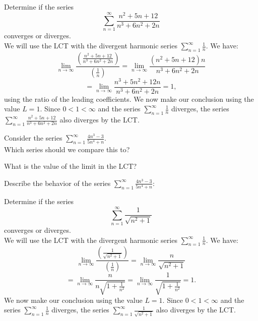 \documentclass{ximera}
\begin{document}
\begin{example}
Determine if the series 
\[
\sum_{n=1}^\infty \frac{n^2 + 5n + 12}{n^3 + 6n^2 + 2n}
\]
converges or diverges.\\
We will use the LCT with the divergent harmonic series $\displaystyle{\sum_{n=1}^\infty \frac{1}{n}}$. We have:
\[
\lim_{n \to \infty} \frac{\left(\frac{n^2 + 5n + 12}{n^3 + 6n^2 + 2n}\right)}{\left(\frac{1}{n}\right)} = \lim_{n \to \infty} \frac{(n^2 + 5n + 12)n}{n^3 + 6n^2 + 2n}
\]
\[
= \lim_{n \to \infty} \frac{n^3 + 5n^2 + 12n}{n^3 + 6n^2 + 2n} = 1,
\]
using the ratio of the leading coefficients. We now make our conclusion using the value $L = 1$. Since $0 < 1 < \infty$ and the series $\displaystyle{\sum_{n=1}^\infty \frac{1}{n}}$
diverges, the series $\displaystyle{\sum_{n=1}^\infty \frac{n^2 + 5n + 12}{n^3 + 6n^2 + 2n}}$ also diverges by the LCT.
\end{example}




\begin{problem}
Consider the series $\displaystyle{\sum_{n=1}^\infty \frac{4n^3 -3}{5n^4 + n}}$.\\
Which series should we compare this to?

\begin{multipleChoice}
\end{multipleChoice}

What is the value of the limit in the LCT?
\begin{multipleChoice}
\end{multipleChoice}

Describe the behavior of the series $\displaystyle{\sum_{n=1}^\infty \frac{4n^3 -3}{5n^4 +n}:}$
\begin{multipleChoice}
\end{multipleChoice}

\end{problem}





\begin{example}
Determine if the series 
\[
\sum_{n=1}^\infty \frac{1}{\sqrt{n^2 + 1}}
\]
converges or diverges.\\
We will use the LCT with the divergent harmonic series $\displaystyle{\sum_{n=1}^\infty \frac{1}{n}}$. We have:
\[
\lim_{n \to \infty} \frac{\left(\frac{1}{\sqrt{n^2 + 1}}\right)}{\left(\frac{1}{n}\right)} = \lim_{n \to \infty} \frac{n}{\sqrt{n^2 + 1}}
\]
\[
= \lim_{n \to \infty} \frac{n}{n\sqrt{1 + \frac{1}{n^2}}} = \lim_{n \to \infty} \frac{1}{\sqrt{1 + \frac{1}{n^2}}} = 1.
\]
We now make our conclusion using the value $L = 1$. Since $0 < 1 < \infty$ and the series $\displaystyle{\sum_{n=1}^\infty \frac{1}{n}}$
diverges, the series $\displaystyle{\sum_{n=1}^\infty \frac{1}{\sqrt{n^2 + 1}}}$ also diverges by the LCT.
\end{example}
\end{document}
